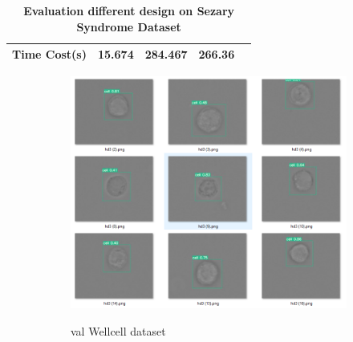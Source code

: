 \begin{table}[t]
{\begin{tabular}{@{}clccc@{}}
Time Cost(s)                                   & 15.674                                                                                                              & 284.467                                                                                                                             & 266.36                                                                                                                                                            \\ \bottomrule
\end{tabular}}
\caption{\textbf{Evaluation different design on Sezary Syndrome Dataset}}
\end{table}


\begin{figure}[t]
	\begin{center}
		\begin{subfigure}[c]{0.6\textwidth}
			\includegraphics[width=\textwidth]{thesis-template-master/images/An illustration test performance of CellYolo best weight.png}
			\label{fig:Debris}
			\caption{val Wellcell dataset}
		\end{subfigure}
		\begin{subfigure}[c]{0.6\textwidth}

\end{subfigure}
\end{center}
\end{figure}
